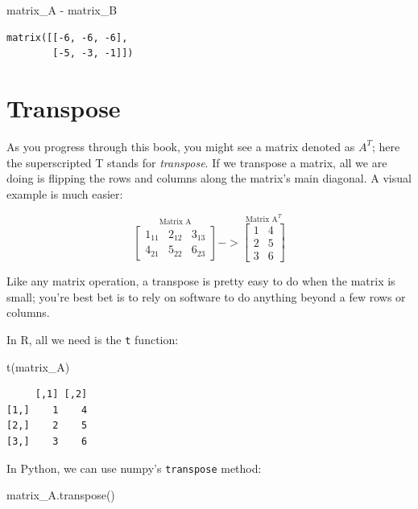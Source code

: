 \documentclass[
  letterpaper,
]{krantz}
\newenvironment{Shaded}{}{}
\newcommand{\FunctionTok}[1]{\textcolor[rgb]{0.02,0.16,0.49}{#1}}
\newcommand{\NormalTok}[1]{#1}
\newcommand{\OperatorTok}[1]{\textcolor[rgb]{0.40,0.40,0.40}{#1}}
\begin{document}
\begin{Shaded}
\begin{Highlighting}[]
\NormalTok{matrix\_A }\OperatorTok{{-}}\NormalTok{ matrix\_B}
\end{Highlighting}
\end{Shaded}

\begin{verbatim}
matrix([[-6, -6, -6],
        [-5, -3, -1]])
\end{verbatim}

\section{Transpose}\label{transpose}

As you progress through this book, you might see a matrix denoted as
\(A^T\); here the superscripted T stands for \emph{transpose}. If we
transpose a matrix, all we are doing is flipping the rows and columns
along the matrix's main diagonal. A visual example is much easier:

\[
\stackrel{\mbox{Matrix A}}{
\begin{bmatrix}
1_{11} & 2_{12} & 3_{13}\\
4_{21} & 5_{22} & 6_{23}
\end{bmatrix}
}
->
\stackrel{\mbox{Matrix A}^T}{
\begin{bmatrix}
1 & 4 \\
2 & 5 \\
3 & 6
\end{bmatrix}
}
\]

Like any matrix operation, a transpose is pretty easy to do when the
matrix is small; you're best bet is to rely on software to do anything
beyond a few rows or columns.

In R, all we need is the \texttt{t} function:

\begin{Shaded}
\begin{Highlighting}[]
\FunctionTok{t}\NormalTok{(matrix\_A)}
\end{Highlighting}
\end{Shaded}

\begin{verbatim}
     [,1] [,2]
[1,]    1    4
[2,]    2    5
[3,]    3    6
\end{verbatim}

In Python, we can use numpy's \texttt{transpose} method:

\begin{Shaded}
\begin{Highlighting}[]
\NormalTok{matrix\_A.transpose()}
\end{Highlighting}
\end{Shaded}
\end{document}
